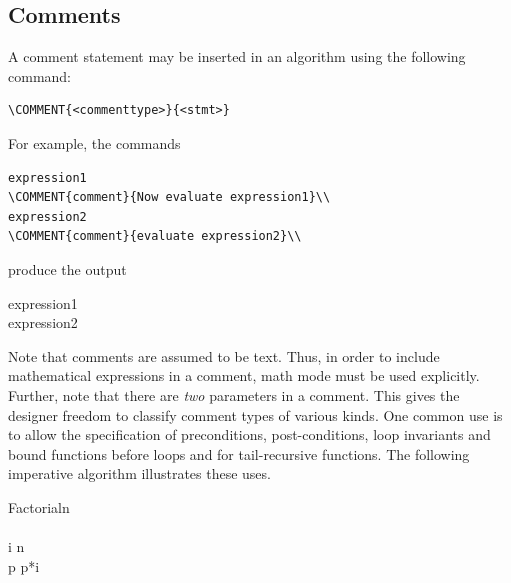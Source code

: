 \documentclass[a4]{article}
\begin{document}
\subsection{Comments}

A comment statement may be inserted in an algorithm using the
following command:
\begin{verbatim}
\COMMENT{<commenttype>}{<stmt>}
\end{verbatim}
For example, the commands
\begin{verbatim}
expression1 
\COMMENT{comment}{Now evaluate expression1}\\
expression2 
\COMMENT{comment}{evaluate expression2}\\
\end{verbatim}

\noindent{}produce the output

\medskip
\begin{pseudocode}[display]{}{}
expression1  
\\
expression2  
\\
\end{pseudocode}

\medskip

Note that comments are assumed to be text. Thus, in order to include
mathematical expressions in a comment, math mode must be used explicitly. Further, note that there are {\em two} parameters in a comment. This gives the designer freedom to classify comment types of various kinds. One common use is to allow the specification of preconditions, post-conditions, loop invariants and bound functions before loops and for tail-recursive functions. The following imperative algorithm illustrates these uses.

\begin{pseudocode}{Factorial}{n}
  \BEGIN
     \\
     \\
     \FOR i   \TO n \DO\\
     \BEGIN 
        p \GETS p*i\\
        \\
        \\ 
     \END\\
     \\
  \END
\end{pseudocode}
\end{document}
